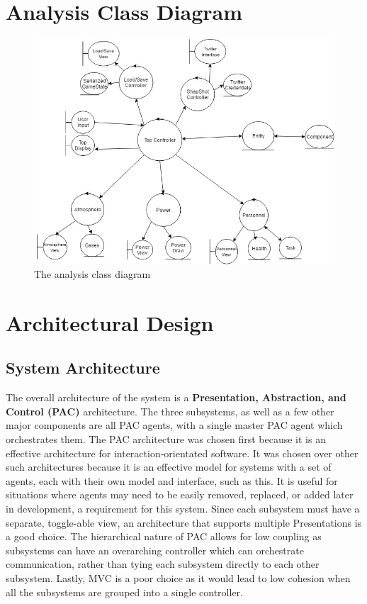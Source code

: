 \documentclass[]{article}
\begin{document}
\section{Analysis Class Diagram}
\label{sec:analysis_class_diagram}
\begin{figure}[H]
	\centering
	\includegraphics[width=120mm]{ACD_primitives.jpg}
	\caption{The analysis class diagram}
\end{figure}


\section{Architectural Design}
\label{sec:architectural_design}

\subsection{System Architecture}
\label{sub:system_architecture}
The overall architecture of the system is a \textbf{Presentation, Abstraction, and Control (PAC)} architecture. The three subsystems, as well as a few other major components are all PAC agents, with a single master PAC agent which orchestrates them. The PAC architecture was chosen first because it is an effective architecture for interaction-orientated software. It was chosen over other such architectures because it is an effective model for systems with a set of agents, each with their own model and interface, such as this. It is useful for situations where agents may need to be easily removed, replaced, or added later in development, a requirement for this system. Since each subsystem must have a separate, toggle-able view, an architecture that supports multiple Presentations is a good choice. The hierarchical nature of PAC allows for low coupling as subsystems can have an overarching controller which can orchestrate communication, rather than tying each subsystem directly to each other subsystem. Lastly, MVC is a poor choice as it would lead to low cohesion when all the subsystems are grouped into a single controller.
\end{document}
